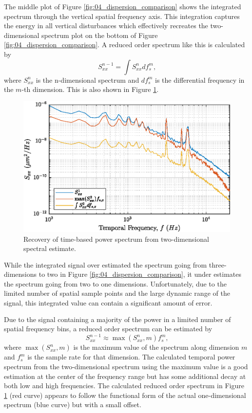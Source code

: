 The middle plot of Figure \ref{fig:04_dispersion_comparison} shows the integrated spectrum through the vertical spatial frequency axis.
This integration captures the energy in all vertical disturbances which effectively recreates the two-dimensional spectrum plot on the bottom of Figure \ref{fig:04_dispersion_comparison}.
A reduced order spectrum like this is calculated by
\begin{equation}
  S_{xx}^{n-1} = \int S_{xx}^n df_s^m \textrm{,}
\end{equation}
where $S_{xx}^n$ is the n-dimensional spectrum and $df_s^m$ is the differential frequency in the $m$-th dimension.
This is also shown in Figure \ref{fig:04_dispersion_max}.
\begin{figure}
  \centering
  \includegraphics{../matlab/04_dispersion_analysis/dispersion_max.eps}
  \caption{Recovery of time-based power spectrum from two-dimensional spectral estimate.}
  \label{fig:04_dispersion_max}
\end{figure}
While the integrated signal over estimated the spectrum going from three-dimensions to two in Figure \ref{fig:04_dispersion_comparison}, it under estimates the spectrum going from two to one dimensions.
Unfortunately, due to the limited number of spatial sample points and the large dynamic range of the signal, this integrated value can contain a significant amount of error.

Due to the signal containing a majority of the power in a limited number of spatial frequency bins, a reduced order spectrum can be estimated by
\begin{equation}
  S_{xx}^{n-1} \approx \max(S_{xx}^n,m)f_s^m \textrm{,}
\end{equation}
where $\max(S_{xx}^n,m)$ is the maximum value of the spectrum along dimension $m$ and $f_s^m$ is the sample rate for that dimension.
The calculated temporal power spectrum from the two-dimensional spectrum using the maximum value is a good estimation at the center of the frequency range but has some additional decay at both low and high frequencies.
The calculated reduced order spectrum in Figure \ref{fig:04_dispersion_max} (red curve) appears to follow the functional form of the actual one-dimensional spectrum (blue curve) but with a small offset.

